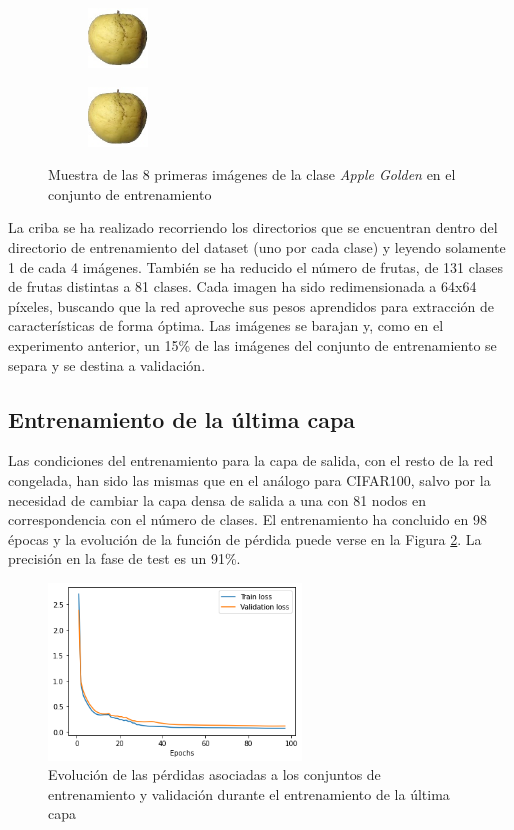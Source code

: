 \documentclass[10pt,a4paper]{article}
\begin{document}
\begin{figure}[h]
	\begin{subfigure}{0.24\textwidth}
		\centering
		\includegraphics[height=60px,width=60px]{apple_golden_train6}
	\end{subfigure}
	\begin{subfigure}{0.24\textwidth}
		\centering
		\includegraphics[height=60px,width=60px]{apple_golden_train7}
	\end{subfigure}
	\caption{Muestra de las 8 primeras imágenes de la clase \textit{Apple Golden} en el conjunto de entrenamiento}
	\label{fig:apple_golden_train}
\end{figure}


La criba se ha realizado recorriendo los directorios que se encuentran dentro del directorio de entrenamiento del dataset (uno por cada clase) y leyendo solamente 1 de cada 4 imágenes. También se ha reducido el número de frutas, de 131 clases de frutas distintas a 81 clases. Cada imagen ha sido redimensionada a 64x64 píxeles, buscando que la red aproveche sus pesos aprendidos para extracción de características de forma óptima. Las imágenes se barajan y, como en el experimento anterior, un 15\% de las imágenes del conjunto de entrenamiento se separa y se destina a validación.

\subsection{Entrenamiento de la última capa}

Las condiciones del entrenamiento para la capa de salida, con el resto de la red congelada, han sido las mismas que en el análogo para CIFAR100, salvo por la necesidad de cambiar la capa densa de salida a una con 81 nodos en correspondencia con el número de clases. El entrenamiento ha concluido en 98 épocas y la evolución de la función de pérdida puede verse en la Figura \ref{fig:loss_fruits}. La precisión en la fase de test es un 91\%.

\begin{figure}[h]
	\centering
	\includegraphics[width=0.6\textwidth]{loss_fruits}
	\caption{Evolución de las pérdidas asociadas a los conjuntos de entrenamiento y validación durante el entrenamiento de la última capa}
	\label{fig:loss_fruits}
\end{figure}
\end{document}
